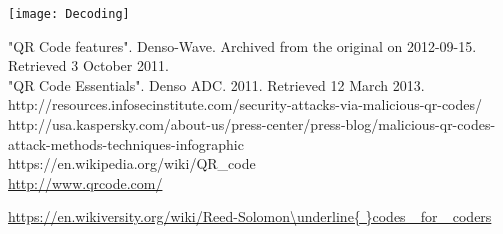 \documentclass[12pt,journal,compsoc]{IEEEtran}
\begin{document}
\begin{center}
\texttt{[image: Decoding]}
\end{center}


\begin{thebibliography}{1}

"QR Code features". Denso-Wave. Archived from the original on 2012-09-15. Retrieved 3 October 2011. \\

"QR Code Essentials". Denso ADC. 2011. Retrieved 12 March 2013. \\

http://resources.infosecinstitute.com/security-attacks-via-malicious-qr-codes/ \\


http://usa.kaspersky.com/about-us/press-center/press-blog/malicious-qr-codes-attack-methods-techniques-infographic \\

https://en.wikipedia.org/wiki/QR_code \\

 \url{http://www.qrcode.com/}

 \url{https://en.wikiversity.org/wiki/Reed-Solomon\underline{ }codes\_ for\_ coders}


\end{thebibliography}
\end{document}
